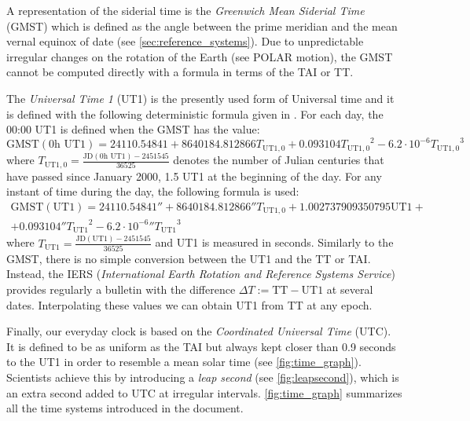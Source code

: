 \documentclass[../main.tex]{subfiles}
\begin{document}
A representation of the siderial time is the \emph{Greenwich Mean Siderial Time} (GMST) which is defined as the angle between the prime meridian and the mean vernal equinox of date (see \cref{sec:reference_systems}). Due to unpredictable irregular changes on the rotation of the Earth (see POLAR motion), the GMST cannot be computed directly with a formula in terms of the TAI or TT.

The \emph{Universal Time 1} (UT1) is the presently used form of Universal time and it is defined with the following deterministic formula given in \cite{aoki}. For each day, the 00:00 UT1 is defined when the GMST has the value:
\begin{equation}
  \mathrm{GMST}(0\text{h UT1})=24110.54841+8640184.812866{T_{\text{UT1},0}}+0.093104{T_{\text{UT1},0}}^2-6.2\cdot 10^{-6}{T_{\text{UT1},0}}^3
\end{equation}
where $T_{\text{UT1},0}=\frac{\text{JD}(0\text{h UT1})-2451545}{36525}$ denotes the number of Julian centuries that have passed since January 2000, 1.5 UT1 at the beginning of the day. For any instant of time during the day, the following formula is used:
\begin{multline}
  \mathrm{GMST}(\mathrm{UT1})=24110.54841''+8640184.812866''{T_{\text{UT1},0}}+1.002737909350795\text{UT1}+\\+0.093104''{T_{\text{UT1}}}^2-{6.2\cdot 10^{-6}}''{T_{\text{UT1}}}^3
\end{multline}
where $T_\text{UT1}=\frac{\text{JD}(\text{UT1})-2451545}{36525}$ and UT1 is measured in seconds. Similarly to the GMST, there is no simple conversion between the UT1 and the TT or TAI. Instead, the IERS (\emph{International Earth Rotation and Reference Systems Service}) provides regularly a bulletin with the difference $\Delta T:= \mathrm{TT}-\mathrm{UT1}$ at several dates. Interpolating these values we can obtain UT1 from TT at any epoch.

Finally, our everyday clock is based on the \emph{Coordinated Universal Time} (UTC). It is defined to be as uniform as the TAI but always kept closer than 0.9 seconds to the UT1 in order to resemble a mean solar time (see \cref{fig:time_graph}). Scientists achieve this by introducing a \emph{leap second} (see \cref{fig:leapsecond}), which is an extra second added to UTC at irregular intervals. \cref{fig:time_graph} summarizes all the time systems introduced in the document.
\end{document}
